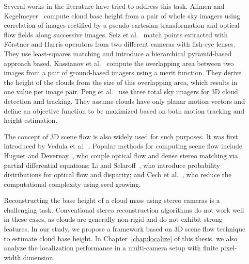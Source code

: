 Several works in the literature have tried to address this task. Allmen and Kegelmeyer~\cite{allmen} compute cloud base height from a pair of whole sky imagers using correlation of images rectified by a pseudo-cartesian transformation and optical flow fields along successive images. Seiz et al.\ \cite{seiz} match points extracted  with F\"orstner and Harris operators from two different cameras with fish-eye lenses. They use least-squares matching and introduce a hierarchical pyramid-based approach based. Kassianov et al.\ \cite{kassianov} compute the overlapping area between two images from a pair of ground-based imagers using a merit function. They derive the height of the clouds from the size of this overlapping area, which results in one value per image pair. Peng et al.\ \cite{peng} use three total sky imagers for 3D cloud detection and tracking. They assume clouds have only planar motion vectors and define an objective function to be maximized based on both motion tracking and height estimation.

The concept of 3D scene flow is also widely used for such purposes. It was first introduced by Vedula et al.\ \cite{vedula1999three}. Popular methods for computing scene flow include Huguet and Devernay~\cite{Huguet07}, who couple optical flow and dense stereo matching via partial differential equations; Li and Sclaroff~\cite{Li200875}, who introduce probability distributions for optical flow and disparity; and Cech et al.\ \cite{cech}, who reduce the computational complexity using seed growing.

Reconstructing the base height of a cloud mass using stereo cameras is a challenging task. Conventional stereo reconstruction algorithms do not work well in these cases, as clouds are generally non-rigid and do not exhibit strong features. In our study, we propose a framework based on 3D scene flow technique to estimate cloud base height. In Chapter~\ref{chap:localize} of this thesis, we also analyze the localization performance in a multi-camera setup with finite pixel-width dimension.

